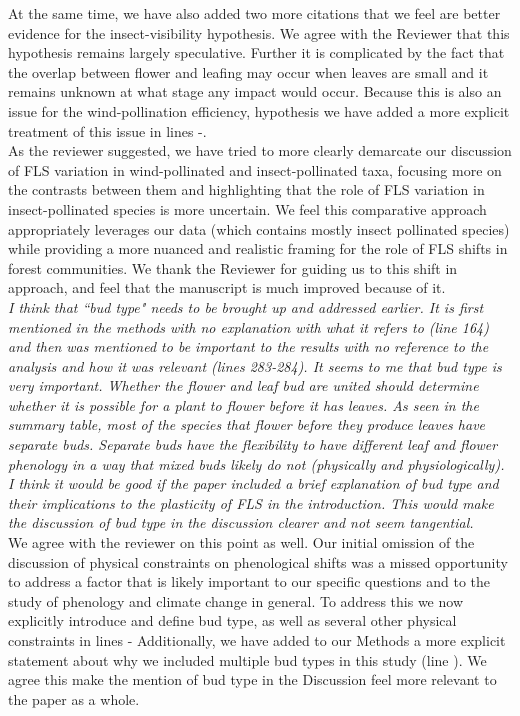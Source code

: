 \documentclass[11pt]{article}
\begin{document}
\noindent At the same time, we have also added two more citations that we feel are better evidence for the insect-visibility hypothesis. We agree with the Reviewer that this hypothesis remains largely speculative. Further it is complicated by the fact that the overlap between flower and leafing may occur when leaves are small and it remains unknown at what stage any impact would occur. Because this is also an issue for the wind-pollination efficiency, hypothesis we have added a more explicit treatment of this issue in lines -.\\ %

\noindent As the reviewer suggested, we have tried to more clearly demarcate our discussion of FLS variation in wind-pollinated and insect-pollinated taxa, focusing more on the contrasts between them and highlighting that the role of FLS variation in insect-pollinated species is more uncertain. We feel this comparative approach appropriately leverages our data (which contains mostly insect pollinated species) while providing a more nuanced and realistic framing for the role of FLS shifts in forest communities. We thank the Reviewer for guiding us to this shift in approach, and feel that the manuscript is much improved because of it.\\

\emph{I think that ``bud type" needs to be brought up and addressed earlier. It is first mentioned in the methods with no explanation with what it refers to (line 164) and then was mentioned to be important to the results with no reference to the analysis and how it was relevant (lines 283-284). It seems to me that bud type is very important. Whether the flower and leaf bud are united should determine whether it is possible for a plant to flower before it has leaves.  As seen in the summary table, most of the species that flower before they produce leaves have separate buds. Separate buds have the flexibility to have different leaf and flower phenology in a way that mixed buds likely do not (physically and physiologically). I think it would be good if the paper included a brief explanation of bud type and their implications to the plasticity of FLS in the introduction. This would make the discussion of bud type in the discussion clearer and not seem tangential.}\\

\noindent We agree with the reviewer on this point as well. Our initial omission of the discussion of physical constraints on phenological shifts was a missed opportunity to address a factor that is likely important to our specific questions and to the study of phenology and climate change in general. To address this we now explicitly introduce and define bud type, as well as several other physical constraints in lines - Additionally, we have added to our Methods a more explicit statement about why we included multiple bud types in this study (line ). We agree this make the mention of bud type in the Discussion feel more relevant to the paper as a whole. \\
\end{document}
